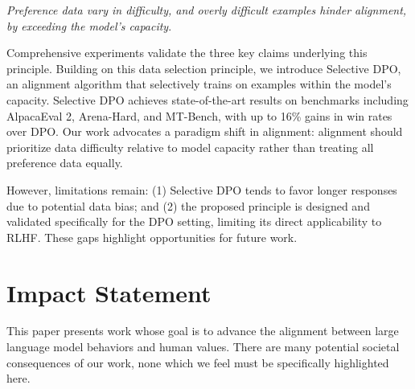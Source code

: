 \textit{Preference data vary in difficulty, and overly difficult examples hinder alignment, by exceeding the model's capacity}. 

Comprehensive experiments validate the three key claims underlying this principle. Building on this data selection principle, we introduce Selective DPO, an alignment algorithm that selectively trains on examples within the model's capacity. Selective DPO achieves state-of-the-art results on benchmarks including AlpacaEval 2, Arena-Hard, and MT-Bench, with up to 16\% gains in win rates over DPO. Our work advocates a paradigm shift in alignment: alignment should prioritize data difficulty relative to model capacity rather than treating all preference data equally. 

However, limitations remain: (1) Selective DPO tends to favor longer responses due to potential data bias; and (2) the proposed principle is designed and validated specifically for the DPO setting, limiting its direct applicability to RLHF. These gaps highlight opportunities for future work.


\clearpage
\section*{Impact Statement}
This paper presents work whose goal is to advance the alignment between large language model behaviors and human values. There are many potential societal consequences of our work, none which we feel must be specifically highlighted here.